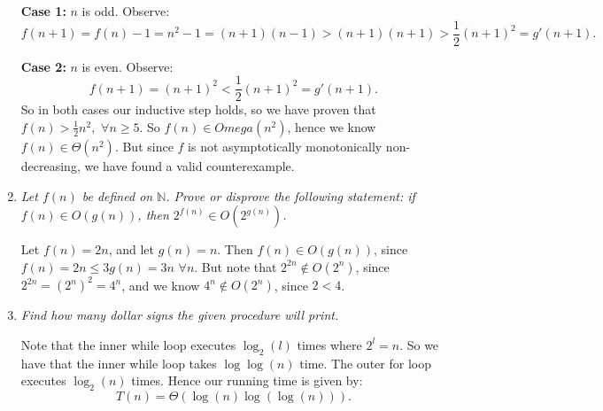 \documentclass[10pt,oneside,reqno]{amsart}
\theoremstyle{plain}
\theoremstyle{definition}
\begin{document}
\begin{enumerate}[label=\arabic*.]
\textbf{Case 1: } $n$ is odd. Observe: 
$$
f(n + 1) = f(n) - 1 = n^2 - 1 = (n + 1)(n - 1) > (n + 1)(n + 1) > \frac{1}{2}(n  +1)^2 = g'(n  +1). 
$$

\textbf{Case 2: }$n$ is even. Observe: 
$$
f(n + 1) = (n + 1)^2 < \frac{1}{2}(n + 1)^2 = g'(n + 1).
$$
So in both cases our inductive step holds, so we have proven that $f(n) > \frac{1}{2}n^2,$ $\forall n \geq 5$. So $f(n) \in Omega(n^2)$, hence we know $f(n) \in \Theta(n^2)$. But since $f$ is not asymptotically monotonically non-decreasing, we have found a valid counterexample. 
\item \textit{Let $f(n)$ be defined on $\mathbb{N}$. Prove or disprove the following statement: if $f(n) \in O(g(n))$, then $2^{f(n)} \in O(2^{g(n)})$. }

Let $f(n) = 2n$, and let $g(n) = n$. Then $f(n) \in O(g(n))$, since $f(n) = 2n \leq 3g(n) = 3n$ $\forall n$. But note that $2^{2n} \notin O(2^{n})$, since $2^{2n} = (2^n)^2 = 4^n$, and we know $4^n \notin O(2^n)$, since $2 < 4$. 

\item \textit{Find how many dollar signs the given procedure will print. }

Note that the inner while loop executes $\log_2(l)$ times where $2^l = n$. So we have that the inner while loop takes $\log\log(n)$ time. The outer for loop executes $\log_2(n)$ times. Hence our running time is given by: 
$$
T(n) = \Theta(\log(n)\log(\log(n))). 
$$


\end{enumerate}
\end{document}
